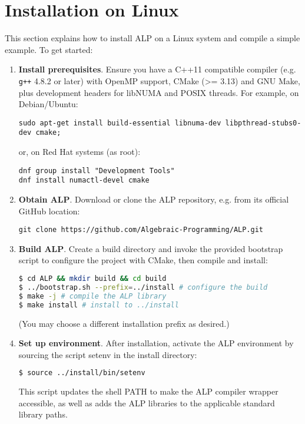 
\section{Installation on Linux}\label{sec:installation}

This section explains how to install ALP on a Linux system and compile a simple example. To get started:

\begin{enumerate}
\item \textbf{Install prerequisites}. Ensure you have a C++11 compatible compiler (e.g. \texttt{g++} 4.8.2 or later) with OpenMP support, CMake (>= 3.13) and GNU Make, plus development headers for libNUMA and POSIX threads. 
For example, on Debian/Ubuntu:
\begin{verbatim}
sudo apt-get install build-essential libnuma-dev libpthread-stubs0-dev cmake;
\end{verbatim}
or, on Red Hat systems (as root):
\begin{verbatim}
dnf group install "Development Tools"
dnf install numactl-devel cmake
\end{verbatim}

\item \textbf{Obtain ALP}. Download or clone the ALP repository, e.g. from its official GitHub location:
\begin{verbatim}
git clone https://github.com/Algebraic-Programming/ALP.git
\end{verbatim}

\item \textbf{Build ALP}. Create a build directory and invoke the provided bootstrap script to configure the project with CMake, then compile and install:
\begin{lstlisting}[language=bash]
$ cd ALP && mkdir build && cd build
$ ../bootstrap.sh --prefix=../install # configure the build
$ make -j # compile the ALP library
$ make install # install to ../install
\end{lstlisting}
(You may choose a different installation prefix as desired.)

\item \textbf{Set up environment}. After installation, activate the ALP environment by sourcing the script setenv in the install directory:
\begin{lstlisting}[language=bash]
$ source ../install/bin/setenv
\end{lstlisting}
This script updates the shell PATH to make the ALP compiler wrapper accessible, as well as adds the ALP libraries to the applicable standard library paths.


\end{enumerate}
